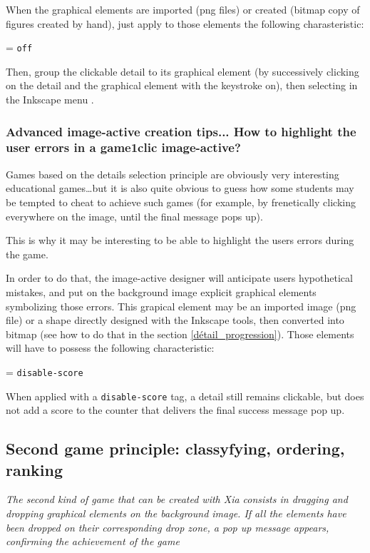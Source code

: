 When the graphical elements are imported (png files) or created (bitmap copy 
of figures created by hand), just apply to those elements the following 
charasteristic:
\begin{center}
 = \verb|off|
\end{center}
Then, group the clickable detail to its graphical element (by successively 
clicking on the detail and the graphical element with the \Shift keystroke on),
then selecting  in the Inkscape menu .

\subsubsection{Advanced image-active creation tips... How to highlight the user errors in a game1clic image-active?}

Games based on the details selection principle are obviously very
interesting educational games\ldots but it is also quite obvious to guess how some 
students may be tempted to cheat to achieve such games (for example, by 
frenetically clicking everywhere on the image, until the final message pops up).

This is why it may be interesting to be able to 
highlight the users errors during the game.

In order to do that, the image-active designer will anticipate users hypothetical mistakes, and 
put on the background image explicit graphical elements symbolizing those errors. 
This grapical element may be an imported image 
(png file) or a shape directly designed with the Inkscape tools, 
then converted into bitmap (see how to do that in the section 
\ref{détail_progression}). Those elements will have to possess the following characteristic:
\begin{center}
 = \verb|disable-score| 
\end{center}
When applied with a \verb|disable-score| tag, a detail still remains clickable, but does not 
add a score to the counter that delivers the final success message pop up.

\subsection{Second game principle: classyfying, ordering, ranking}\label{gameDragAndDropsection}

\textit{The second kind of game that can be created with Xia consists in dragging and dropping graphical elements 
on the background image. If all the elements have been dropped on their corresponding drop zone, a pop up
message appears, confirming the achievement of the game}

